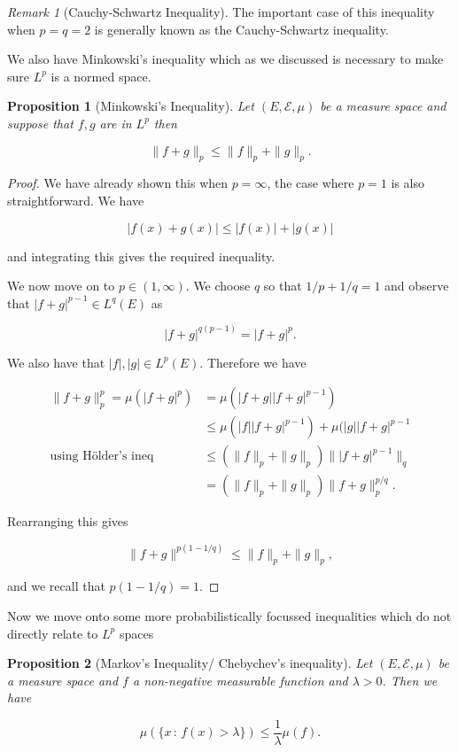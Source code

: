 \documentclass[
]{book}
\newtheorem{proposition}{Proposition}[chapter]
\theoremstyle{definition}
\theoremstyle{definition}
\theoremstyle{definition}
\theoremstyle{definition}
\theoremstyle{remark}
\newtheorem*{remark}{Remark}
\begin{document}
\begin{remark}[Cauchy-Schwartz Inequality]
The important case of this inequality when \(p=q=2\) is generally known as the Cauchy-Schwartz inequality.
\end{remark}

We also have Minkowski's inequality which as we discussed is necessary to make sure \(L^p\) is a normed space.

\begin{proposition}[Minkowski's Inequality]
Let \((E, \mathcal{E}, \mu)\) be a measure space and suppose that \(f,g\) are in \(L^p\) then

\[ \|f+g\|_p \leq \|f\|_p + \|g \|_p. \]
\end{proposition}

\begin{proof}
We have already shown this when \(p=\infty\), the case where \(p=1\) is also straightforward. We have

\[ |f(x) + g(x)| \leq |f(x)| + |g(x)| \]

and integrating this gives the required inequality.

We now move on to \(p \in (1, \infty)\). We choose \(q\) so that \(1/p + 1/q = 1\) and observe that \(|f + g|^{p-1} \in L^q(E)\) as

\[ |f+g|^{q(p-1)}= |f+g|^p. \]

We also have that \(|f|,|g| \in L^p(E)\). Therefore we have

\begin{align*}\|f+g\|_p^p = \mu(|f+g|^p) &= \mu(|f+g| |f+g|^{p-1}) \\
& \leq \mu(|f| |f+g|^{p-1}) + \mu (|g| |f+g|^{p-1} \\
\mbox{using Hölder's ineq} \quad & \leq \left( \|f\|_p + \|g\|_p\right) \| |f+g|^{p-1}\|_q \\
&= \left( \|f\|_p + \|g\|_p \right) \|f+g\|_p^{p/q}.
\end{align*}

Rearranging this gives

\[ \|f+g\|^{p(1-1/q)} \leq \|f\|_p + \|g\|_p, \]

and we recall that \(p(1-1/q) = 1\).
\end{proof}

Now we move onto some more probabilistically focussed inequalities which do not directly relate to \(L^p\) spaces

\begin{proposition}[Markov's Inequality/ Chebychev's inequality]
Let \((E, \mathcal{E}, \mu)\) be a measure space and \(f\) a non-negative measurable function and \(\lambda>0\). Then we have

\[ \mu(\{ x\,:\, f(x) > \lambda\}) \leq \frac{1}{\lambda} \mu(f). \]
\end{proposition}
\end{document}

